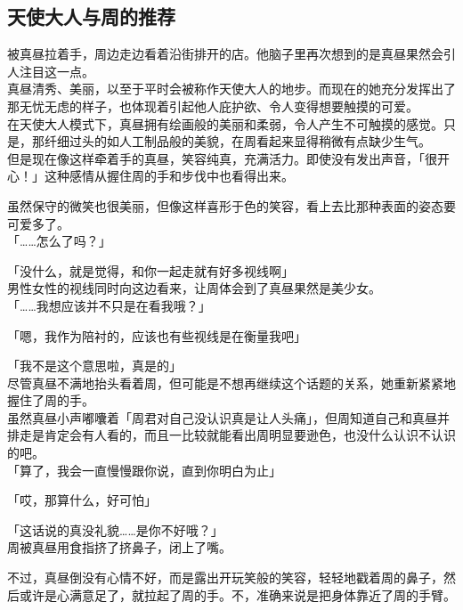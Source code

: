 \subsection{天使大人与周的推荐}

被真昼拉着手，周边走边看着沿街排开的店。他脑子里再次想到的是真昼果然会引人注目这一点。\\

真昼清秀、美丽，以至于平时会被称作天使大人的地步。而现在的她充分发挥出了那无忧无虑的样子，也体现着引起他人庇护欲、令人变得想要触摸的可爱。\\

在天使大人模式下，真昼拥有绘画般的美丽和柔弱，令人产生不可触摸的感觉。只是，那纤细过头的如人工制品般的美貌，在周看起来显得稍微有点缺少生气。\\

但是现在像这样牵着手的真昼，笑容纯真，充满活力。即使没有发出声音，「很开心！」这种感情从握住周的手和步伐中也看得出来。

虽然保守的微笑也很美丽，但像这样喜形于色的笑容，看上去比那种表面的姿态要可爱多了。\\

「……怎么了吗？」

「没什么，就是觉得，和你一起走就有好多视线啊」\\

男性女性的视线同时向这边看来，让周体会到了真昼果然是美少女。\\

「……我想应该并不只是在看我哦？」

「嗯，我作为陪衬的，应该也有些视线是在衡量我吧」

「我不是这个意思啦，真是的」\\

尽管真昼不满地抬头看着周，但可能是不想再继续这个话题的关系，她重新紧紧地握住了周的手。\\

虽然真昼小声嘟囔着「周君对自己没认识真是让人头痛」，但周知道自己和真昼并排走是肯定会有人看的，而且一比较就能看出周明显要逊色，也没什么认识不认识的吧。\\

「算了，我会一直慢慢跟你说，直到你明白为止」

「哎，那算什么，好可怕」

「这话说的真没礼貌……是你不好哦？」\\

周被真昼用食指挤了挤鼻子，闭上了嘴。

不过，真昼倒没有心情不好，而是露出开玩笑般的笑容，轻轻地戳着周的鼻子，然后或许是心满意足了，就拉起了周的手。不，准确来说是把身体靠近了周的手臂。\\

